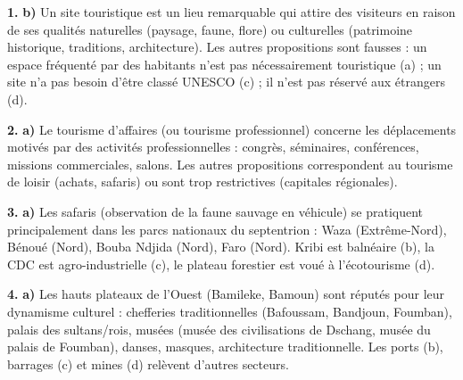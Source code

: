 \documentclass[11pt]{article}
\begin{document}
\begin{corrige}
\textbf{1.} \textbf{b)} Un site touristique est un lieu remarquable qui attire des visiteurs en raison de ses qualités naturelles (paysage, faune, flore) ou culturelles (patrimoine historique, traditions, architecture). Les autres propositions sont fausses : un espace fréquenté par des habitants n'est pas nécessairement touristique (a) ; un site n'a pas besoin d'être classé UNESCO (c) ; il n'est pas réservé aux étrangers (d).

\textbf{2.} \textbf{a)} Le tourisme d'affaires (ou tourisme professionnel) concerne les déplacements motivés par des activités professionnelles : congrès, séminaires, conférences, missions commerciales, salons. Les autres propositions correspondent au tourisme de loisir (achats, safaris) ou sont trop restrictives (capitales régionales).

\textbf{3.} \textbf{a)} Les safaris (observation de la faune sauvage en véhicule) se pratiquent principalement dans les parcs nationaux du septentrion : Waza (Extrême-Nord), Bénoué (Nord), Bouba Ndjida (Nord), Faro (Nord). Kribi est balnéaire (b), la CDC est agro-industrielle (c), le plateau forestier est voué à l'écotourisme (d).

\textbf{4.} \textbf{a)} Les hauts plateaux de l'Ouest (Bamileke, Bamoun) sont réputés pour leur dynamisme culturel : chefferies traditionnelles (Bafoussam, Bandjoun, Foumban), palais des sultans/rois, musées (musée des civilisations de Dschang, musée du palais de Foumban), danses, masques, architecture traditionnelle. Les ports (b), barrages (c) et mines (d) relèvent d'autres secteurs.
\end{corrige}
\end{document}
